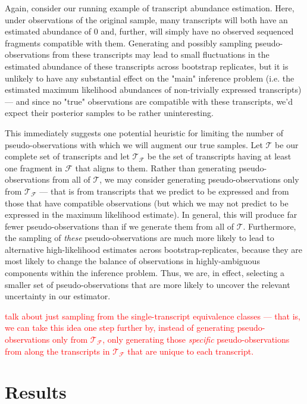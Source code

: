 Again, consider our running example of transcript abundance estimation. Here, under observations 
of the original sample, many transcripts will both have an estimated abundance of 0 and, further, 
will simply have no observed sequenced fragments compatible with them.  Generating and possibly 
sampling pseudo-observations from these transcripts may lead to small fluctuations in the estimated 
abundance of these transcripts across bootstrap replicates, but it is unlikely to have any 
substantial effect on the "main" inference problem (i.e. the estimated maximum likelihood 
abundances of non-trivially expressed transcripts) — and since no "true" observations are 
compatible with these transcripts, we'd expect their posterior samples to be rather uninteresting.

This immediately suggests one potential heuristic for limiting the number of pseudo-observations 
with which we will augment our true samples. Let $\mathcal{T}$ be our complete set of transcripts 
and let $\mathcal{T}_\mathcal{F}$ be the set of transcripts having at least one fragment in 
$\mathcal{F}$ that aligns to them. Rather than generating pseudo-observations from all of 
$\mathcal{T}$, we may consider generating pseudo-observations only from 
$\mathcal{T}_\mathcal{F}$ — that is from transcripts that we predict to be expressed and from those 
that have compatible observations (but which we may not predict to be expressed in the maximum 
likelihood estimate). In general, this will produce far fewer pseudo-observations than if we 
generate them from all of $\mathcal{T}$. Furthermore, the sampling of \textit{these} 
pseudo-observations are much more likely to lead to alternative high-likelihood estimates across 
bootstrap-replicates, because they are most likely to change the balance of observations in 
highly-ambiguous components within the inference problem. Thus, we are, in effect, selecting a 
smaller set of pseudo-observations that are more likely to uncover the relevant uncertainty 
in our estimator.

\textcolor{red}{talk about just sampling from the single-transcript equivalence classes — that is, 
we can take this idea one step further by, instead of generating pseudo-observations only from 
$\mathcal{T}_\mathcal{F}$, only generating those \textit{specific} pseudo-observations from along 
the transcripts in $\mathcal{T}_\mathcal{F}$ that are unique to each transcript.}



\section{Results}

